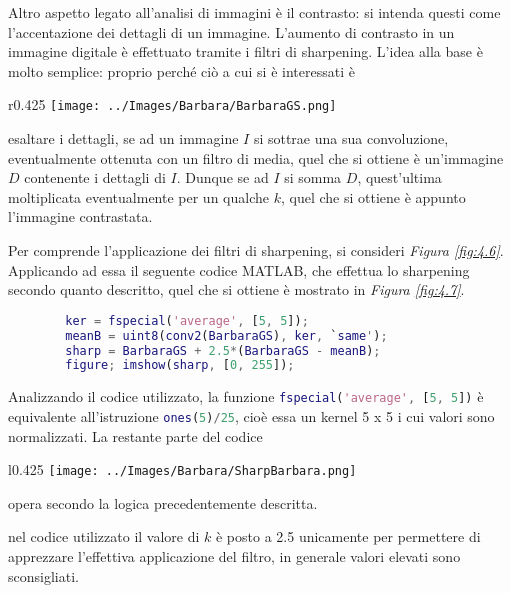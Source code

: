 \documentclass{subfiles}
\begin{document}
Altro aspetto legato all'analisi di immagini è il contrasto: si intenda questi come l'accentazione dei dettagli di un immagine.
L'aumento di contrasto in un immagine digitale è effettuato tramite i filtri di sharpening.
L'idea alla base è molto semplice: proprio perché ciò a cui si è interessati è
\begin{wrapfigure}[13]{r}{0.425\textwidth}
    \centering
    \texttt{[image: ../Images/Barbara/BarbaraGS.png]}
    \caption{BarbaraGS.}
    \label{fig:4.6}
\end{wrapfigure}
esaltare i dettagli, se ad un immagine \(I\) si sottrae una sua convoluzione,
eventualmente ottenuta con un filtro di media, quel che si ottiene è un'immagine \(D\) contenente i dettagli di \(I\). Dunque se ad \(I\) si somma \(D\),
quest'ultima moltiplicata eventualmente per un qualche \(k\), quel che si ottiene è appunto l'immagine contrastata.

Per comprende l'applicazione dei filtri di sharpening, si consideri \emph{Figura \ref{fig:4.6}}.
Applicando ad essa il seguente codice MATLAB, che effettua lo sharpening secondo quanto descritto, quel che si ottiene è mostrato in \emph{Figura \ref{fig:4.7}}.
\begin{center}
    \begin{lstlisting}[language = MATLAB]
        % caricamento di BarbaraGS.png
        ker = fspecial('average', [5, 5]);
        meanB = uint8(conv2(BarbaraGS), ker, `same');
        sharp = BarbaraGS + 2.5*(BarbaraGS - meanB);
        figure; imshow(sharp, [0, 255]);
    \end{lstlisting}
\end{center}

Analizzando il codice utilizzato, la funzione \lstinline[language = MATLAB]{fspecial('average', [5, 5])} è equivalente all'istruzione
\lstinline[language = MATLAB]{ones(5)/25}, cioè essa un kernel 5 x 5 i cui valori sono normalizzati.
La restante parte del codice
\begin{wrapfigure}[13]{l}{0.425\textwidth}
    \centering
    \texttt{[image: ../Images/Barbara/SharpBarbara.png]}
    \caption{\emph{Figura \ref{fig:4.6}} sottoposta a filtro di sharpening.}
    \label{fig:4.7}
\end{wrapfigure}
opera secondo la logica precedentemente descritta.

\begin{Note*}
    nel codice utilizzato il valore di \(k\) è posto a 2.5 unicamente per permettere di apprezzare l'effettiva applicazione del filtro,
    in generale valori elevati sono sconsigliati.
\end{Note*}
\end{document}
